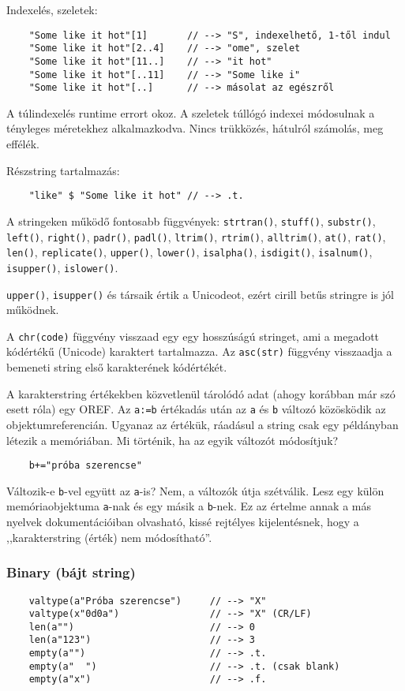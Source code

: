 Indexelés, szeletek:
\begin{verbatim}
    "Some like it hot"[1]       // --> "S", indexelhető, 1-től indul
    "Some like it hot"[2..4]    // --> "ome", szelet
    "Some like it hot"[11..]    // --> "it hot"
    "Some like it hot"[..11]    // --> "Some like i"
    "Some like it hot"[..]      // --> másolat az egészről
\end{verbatim}
A túlindexelés runtime errort okoz. 
A szeletek túllógó indexei módosulnak a tényleges méretekhez alkalmazkodva. 
Nincs trükközés, hátulról számolás, meg effélék.

Részstring tartalmazás:
\begin{verbatim}
    "like" $ "Some like it hot" // --> .t.
\end{verbatim}


A stringeken működő fontosabb függvények: 
\verb!strtran()!, 
\verb!stuff()!, 
\verb!substr()!, 
\verb!left()!, 
\verb!right()!, 
\verb!padr()!,
\verb!padl()!, 
\verb!ltrim()!, 
\verb!rtrim()!, 
\verb!alltrim()!, 
\verb!at()!, 
\verb!rat()!, 
\verb!len()!, 
\verb!replicate()!,
\verb!upper()!,
\verb!lower()!,
\verb!isalpha()!,
\verb!isdigit()!,
\verb!isalnum()!,
\verb!isupper()!,
\verb!islower()!.

\verb!upper()!, \verb!isupper()! és társaik értik a Unicodeot, 
ezért cirill betűs stringre is jól működnek.

A \verb!chr(code)! függvény visszaad egy egy hosszúságú stringet,
ami a megadott kódértékű (Unicode) karaktert tartalmazza.
Az \verb!asc(str)! függvény visszaadja a bemeneti string első karakterének
kódértékét.


A karakterstring értékekben közvetlenül tárolódó adat 
(ahogy korábban már szó esett róla) egy OREF. Az \verb!a:=b!
értékadás után az \verb!a! és \verb!b! változó közösködik
az objektumreferencián. Ugyanaz az értékük, ráadásul a string csak egy 
példányban létezik a memóriában. Mi történik, ha az egyik változót módosítjuk?
\begin{verbatim}
    b+="próba szerencse"
\end{verbatim}
Változik-e \verb!b!-vel együtt az \verb!a!-is? Nem, a változók útja szétválik.
Lesz egy külön memóriaobjektuma \verb!a!-nak és egy másik a \verb!b!-nek.
Ez az értelme annak a más nyelvek dokumentációiban olvasható, kissé rejtélyes
kijelentésnek, hogy a ,,karakterstring (érték) nem módosítható''. 


\subsubsection{Binary (bájt string)}
\begin{verbatim}
    valtype(a"Próba szerencse")     // --> "X"
    valtype(x"0d0a")                // --> "X" (CR/LF)
    len(a"")                        // --> 0
    len(a"123")                     // --> 3
    empty(a"")                      // --> .t.
    empty(a"  ")                    // --> .t. (csak blank)
    empty(a"x")                     // --> .f.
\end{verbatim}

